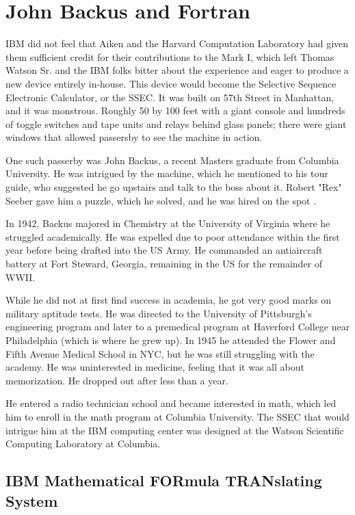 \section{John Backus and Fortran}

IBM did not feel that Aiken and the Harvard Computation Laboratory had given
them sufficient credit for their contributions to the Mark I, which left
Thomas Watson Sr. and the IBM folks bitter about the experience and eager to
produce a new device entirely in-house. This device would become the Selective
Sequence Electronic Calculator, or the SSEC. It was built on 57th Street in
Manhattan, and it was monstrous. Roughly 50 by 100 feet with a giant console
and hundreds of toggle switches and tape units and relays behind glass panels;
there were giant windows that allowed passersby to see the machine in action.

One such passerby was John Backus, a recent Masters graduate from Columbia
University. He was intrigued by the machine, which he mentioned to his tour
guide, who suggested he go upstairs and talk to the boss about it. Robert "Rex"
Seeber gave him a puzzle, which he solved, and he was hired on the spot
\cite{backus_oral_history_2006}.

In 1942, Backus majored in Chemistry at the University of Virginia where he
struggled academically. He was expelled due to poor attendance within the first
year before being drafted into the US Army. He commanded an antiaircraft
battery at Fort Steward, Georgia, remaining in the US for the remainder of
WWII.

While he did not at first find success in academia, he got very good marks on
military aptitude tests. He was directed to the University of Pittsburgh's
engineering program and later to a premedical program at Haverford College near
Philadelphia (which is where he grew up). In 1945 he attended the Flower and
Fifth Avenue Medical School in NYC, but he was still struggling with the
academy. He was uninterested in medicine, feeling that it was all about
memorization. He dropped out after less than a year.

He entered a radio technician school and became interested in math, which led
him to enroll in the math program at Columbia University. The SSEC that would
intrigue him at the IBM computing center was designed at the Watson Scientific
Computing Laboratory at Columbia.

\subsection{IBM Mathematical FORmula TRANslating System}

